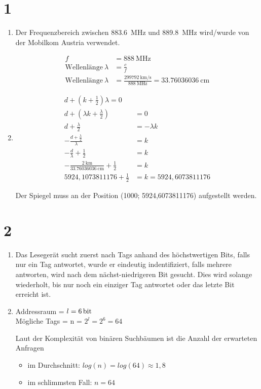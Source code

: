 \documentclass[ngerman]{scrartcl}
\begin{document}
\section*{1}
  \begin{enumerate}[label=\alph*)]
    \item
      Der Frequenzbereich zwischen \SI{883,6}{\mega\hertz} und \SI{889,8}{\mega\hertz} wird/wurde von der Mobilkom Austria verwendet.

      \begin{align*}
        f &= \SI{888}{\mega\hertz} \\
        \text{Wellenlänge}\ \lambda &= \frac{c}{f} \\
        \text{Wellenlänge}\ \lambda &= \frac{\SI{299792}{\kilo\meter\per\second}}{\SI{888}{\mega\hertz}} = \SI{33,76036036}{\centi\meter}
      \end{align*}

    \item
      \begin{align*}
        d + (k + \frac{1}{2}) \lambda = 0 \\
        d + (\lambda k + \frac{\lambda}{2}) &= 0 \\
        d + \frac{\lambda}{2} &= -\lambda k \\
        -\frac{d + \frac{\lambda}{2}}{\lambda} &= k \\
        -\frac{d}{\lambda} + \frac{1}{2} &= k \\
        -\frac{\SI{2}{\kilo\meter}}{\SI{33,76036036}{\centi\meter}} + \frac{1}{2} &= k \\
        5924,1073811176 + \frac{1}{2} &= k = 5924,6073811176
      \end{align*}

      Der Spiegel muss an der Position (1000; 5924,6073811176) aufgestellt werden.
  \end{enumerate}

\section*{2}
  \begin{enumerate}[label=\alph*)]
    \item
      Das Lesegerät sucht zuerst nach Tags anhand des höchstwertigen Bits, falls nur ein Tag antwortet, wurde er eindeutig indentifiziert, falls mehrere antworten, wird nach dem nächst-niedrigeren Bit gesucht. Dies wird solange wiederholt, bis nur noch ein einziger Tag antwortet oder das letzte Bit erreicht ist.
    \item
      Addressraum = $l = \SI{6}{\bit}$ \\
      Mögliche Tags = n = $2^l = 2^6 = 64$

      Laut der Komplexität von binären Suchbäumen ist die Anzahl der erwarteten Anfragen

      \begin{itemize}
        \item im Durchschnitt: $log(n) = log(64) \approx 1,8$ \\
        \item im schlimmsten Fall: $n = 64$
      \end{itemize}
  \end{enumerate}
\end{document}
